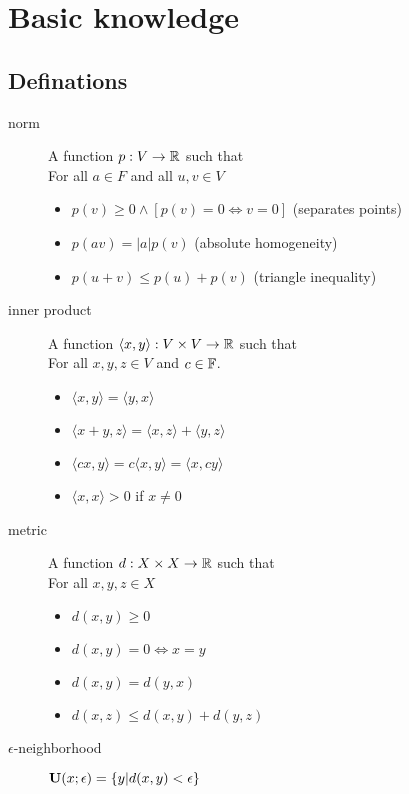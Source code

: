 \section{Basic knowledge}

\subsection{Definations}
\begin{description}
\item[norm] A function $p:V\to{\mathbb R}$ such that\label{def:norm}\hfill\\
	For all $a\in F$ and all $u,v\in V$
	\begin{itemize}
	\item $p(v) \geq 0 \wedge [p(v) = 0 \iff v=0]$ (separates points)
	\item $p(av)=|a|p(v)$ (absolute homogeneity)
	\item $p(u + v) \leq p(u) + p(v)$ (triangle inequality)
	\end{itemize}

\item[inner product]\label{def:innerprod}
	A function $\langle x,y\rangle : V\times V \to {\mathbb R}$ such that \hfill\\
	For all $x,y,z \in V$ and $c\in{\mathbb F}$.
	\begin{itemize}
	\item $\langle x,y\rangle = \langle y,x\rangle$
	\item $\langle x+y,z\rangle = \langle x,z\rangle + \langle y,z\rangle$
	\item $\langle cx,y\rangle = c\langle x,y\rangle = \langle x,cy\rangle$
	\item $\langle x,x\rangle > 0$ if $x\neq 0$
	\end{itemize}

\item[metric]\label{def:metric}
	A function $d: X \times X \to {\mathbb R}$ such that \hfill\\
	For all $x, y, z \in X$
	\begin{itemize}
	\item $d(x, y)\geq 0$
	\item $d(x, y) = 0 \iff x=y$
	\item $d(x, y) = d(y, x)$
	\item $d(x, z) \leq d(x, y) + d(y, z)$
	\end{itemize}

\item[$\epsilon$-neighborhood]${\mathbf U}(x;\epsilon)=\{y|d(x,y)<\epsilon\}$


\end{description}
